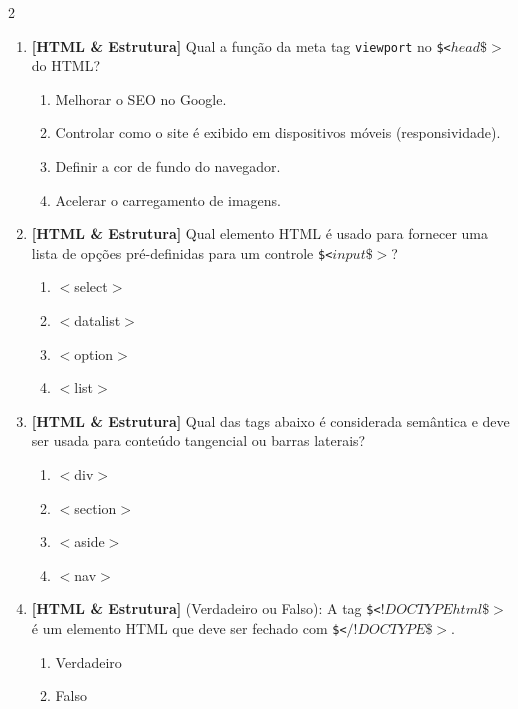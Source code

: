\documentclass[a4paper,10pt]{article}
\begin{document}
\begin{multicols*}{2}
\begin{enumerate}[label=\textbf{\arabic*.}, leftmargin=*]
\item \textbf{[HTML \& Estrutura]} Qual a função da meta tag \texttt{viewport} no \texttt{\$<$head\$>$} do HTML?
\begin{enumerate}[label=(\alph*), noitemsep]
  \item Melhorar o SEO no Google.
  \item Controlar como o site é exibido em dispositivos móveis (responsividade).
  \item Definir a cor de fundo do navegador.
  \item Acelerar o carregamento de imagens.
\end{enumerate}

\item \textbf{[HTML \& Estrutura]} Qual elemento HTML é usado para fornecer uma lista de opções pré-definidas para um controle \texttt{\$<$input\$>$}?
\begin{enumerate}[label=(\alph*), noitemsep]
  \item $<$select$>$
  \item $<$datalist$>$
  \item $<$option$>$
  \item $<$list$>$
\end{enumerate}

\item \textbf{[HTML \& Estrutura]} Qual das tags abaixo é considerada semântica e deve ser usada para conteúdo tangencial ou barras laterais?
\begin{enumerate}[label=(\alph*), noitemsep]
  \item $<$div$>$
  \item $<$section$>$
  \item $<$aside$>$
  \item $<$nav$>$
\end{enumerate}

\item \textbf{[HTML \& Estrutura]} (Verdadeiro ou Falso): A tag \texttt{\$<$!DOCTYPE html\$>$} é um elemento HTML que deve ser fechado com \texttt{\$<$/!DOCTYPE\$>$}.
\begin{enumerate}[label=(\alph*), noitemsep]
  \item Verdadeiro
  \item Falso
\end{enumerate}

\end{enumerate}
\end{multicols*}
\newpage
\end{document}
